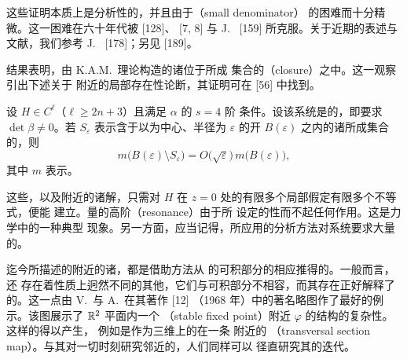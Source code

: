这些证明本质上是分析性的，并且由于\textbf{\trSmallDenominator}（small denominator）%
的困难而十分精微。这一困难在六十年代被\trKolmogorov{} [128]、\trArnold{} [7, 8]%
与 J.~\trMoser{} [159] 所克服。关于近期的表述与文献，我们参考%
J.~\trPoschel{} [178]；另见 [189]。

结果表明，由 K.A.M.~理论构造的诸\trInvariant\trTorus{}位于\trPeriodicOrbit{}所成%
集合的\textbf{\trClosure}（closure）之中。这一观察引出下述关于\trEquilibrium{}%
附近\trPeriodicOrbit{}的局部存在性论断，其证明可在 [56] 中找到。

\begin{theorem}\label{thm:local-existence-periodic-orbits}
设 $H\in C^{\ell}$（$\ell\geq2n+3$）且满足 $\alpha$ 的 $s=4$ 阶\trNonresonance{}%
条件。设该系统是\trNonlinear{}的，即要求 $\det\beta\neq0$。若 $S_\varepsilon$%
表示含于以\trEquilibrium{}为中心、半径为 $\varepsilon$ 的开\trBall{}%
$B(\varepsilon)$ 之内的诸\trPeriodicSolution{}所成集合的\trClosure，则
\[
m\bigl(B(\varepsilon)\setminus S_\varepsilon\bigr)
=O\bigl(\sqrt{\varepsilon}\bigr)\,m\bigl(B(\varepsilon)\bigr),
\]
其中 $m$ 表示\trLebesgue{}\trMeasure。
\end{theorem}

这些\trPeriodicSolution，以及\trEquilibrium{}附近的诸\trQuasiPeriodic{}解，只需对%
$H$ 在 $z=0$ 处的有限多个局部\trSymplecticInvariant{}假定有限多个不等式，便能%
建立。\trLinear{}\trInvariant{}量的高阶\textbf{\trResonance}（resonance）由于所%
设定的\trNonlinear{}性而不起任何作用。这是\trHamiltonian{}力学中的一种典型%
现象。另一方面，应当记得，所应用的分析方法对系统要求大量的\trDerivative。

迄今所描述的\trEquilibrium{}附近的诸\trOrbit，都是借助\trPerturbation{}方法从%
\trBirkhoff\trNormalForm{}的可积部分的相应\trOrbit{}推得的。一般而言，还%
存在着性质上迥然不同的其他\trOrbit，它们与可积部分不相容，而其存在正好解释了%
\trNormalForm{}的\trDivergence。这一点由 V.~\trArnold{}与 A.~\trAvez{}在其著作 [12]%
（1968 年）中的著名略图作了最好的例示。该图展示了 $\mathbb{R}^{2}$ 平面内一个%
\textbf{\trStable\trFixedPoint}（stable fixed point）附近\trNonlinear\trSymplectic%
\trMapping{} $\varphi$ 的\trOrbit{}结构的复杂性。这样的\trMapping{}得以产生，%
例如是作为三维\trEnergySurface{}上的\trHamiltonianSystem{}在一条%
\trStable\trPeriodicOrbit{}附近的\textbf{\trTransversalSection\trMapping}%
（transversal section map）。与其对一切时刻研究邻近的\trOrbit，人们同样可以%
径直研究其\trSection{}\trMapping{}的迭代。

